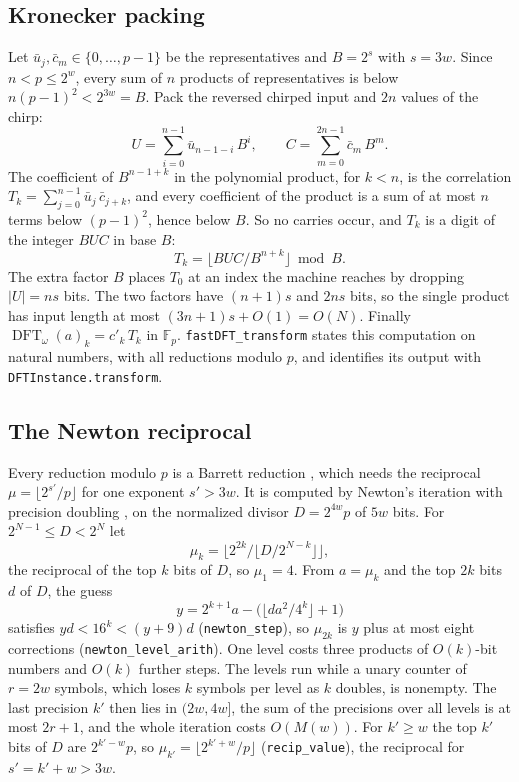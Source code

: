 \documentclass[11pt]{amsart}
\newcommand{\F}{\mathbb{F}}
\newcommand{\DFT}{\operatorname{DFT}}
\newcommand{\lean}[1]{\texttt{#1}}
\begin{document}
\subsection{Kronecker packing}
Let $\bar u_j, \bar c_m \in \{0, \dots, p-1\}$ be the representatives and $B = 2^s$ with
$s = 3w$. Since $n < p \le 2^w$, every sum of $n$ products of representatives is below
$n (p-1)^2 < 2^{3w} = B$. Pack the reversed chirped input and $2n$ values of the chirp:
\[
  U = \sum_{i=0}^{n-1} \bar u_{n-1-i}\, B^i, \qquad C = \sum_{m=0}^{2n-1} \bar c_m\, B^m .
\]
The coefficient of $B^{n-1+k}$ in the polynomial product, for $k < n$, is the correlation
$T_k = \sum_{j=0}^{n-1} \bar u_j\, \bar c_{j+k}$, and every coefficient of the product is a
sum of at most $n$ terms below $(p-1)^2$, hence below $B$. So no carries occur, and $T_k$ is a
digit of the integer $BUC$ in base $B$:
\[
  T_k = \bigl\lfloor BUC / B^{n+k} \bigr\rfloor \bmod B .
\]
The extra factor $B$ places $T_0$ at an index the machine reaches by dropping $|U| = ns$ bits.
The two factors have $(n+1)s$ and $2ns$ bits, so the single product has input length at most
$(3n+1)s + O(1) = O(N)$. Finally $\DFT_\omega(a)_k = c'_k\, T_k$ in $\F_p$.
\lean{fastDFT\_transform} states this computation on natural numbers, with all reductions
modulo $p$, and identifies its output with \lean{DFTInstance.transform}.

\subsection{The Newton reciprocal}
\label{sec:newton}
Every reduction modulo $p$ is a Barrett reduction \cite{Bar}, which needs the reciprocal
$\mu = \lfloor 2^{s'} / p \rfloor$ for one exponent $s' > 3w$. It is computed by Newton's
iteration with precision doubling \cite[\S 4.3.3]{Knu}, on the normalized divisor
$D = 2^{4w} p$ of $5w$ bits. For $2^{N-1} \le D < 2^N$ let
\[
  \mu_k = \bigl\lfloor 2^{2k} / \lfloor D / 2^{N-k} \rfloor \bigr\rfloor,
\]
the reciprocal of the top $k$ bits of $D$, so $\mu_1 = 4$. From $a = \mu_k$ and the top $2k$
bits $d$ of $D$, the guess
\[
  y = 2^{k+1} a - \bigl(\lfloor d a^2 / 4^k \rfloor + 1\bigr)
\]
satisfies $y d < 16^k < (y + 9) d$ (\lean{newton\_step}), so $\mu_{2k}$ is $y$ plus at most
eight corrections (\lean{newton\_level\_arith}). One level costs three products of $O(k)$-bit
numbers and $O(k)$ further steps. The levels run while a unary counter of $r = 2w$ symbols,
which loses $k$ symbols per level as $k$ doubles, is nonempty. The last precision $k'$ then
lies in $(2w, 4w]$, the sum of the precisions over all levels is at most $2r + 1$, and the
whole iteration costs $O(M(w))$. For $k' \ge w$ the top $k'$ bits of $D$ are
$2^{k'-w} p$, so $\mu_{k'} = \lfloor 2^{k'+w} / p \rfloor$ (\lean{recip\_value}), the
reciprocal for $s' = k' + w > 3w$.
\end{document}
